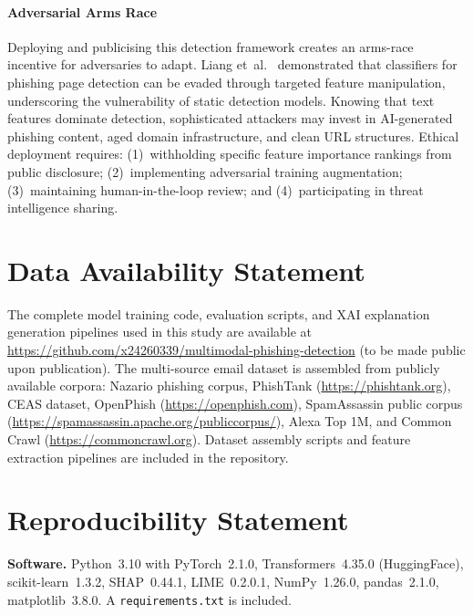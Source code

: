 \documentclass[conference]{IEEEtran}
\begin{document}
\paragraph{Adversarial Arms Race}
Deploying and publicising this detection framework creates an arms-race
incentive for adversaries to adapt. Liang et~al.~\cite{liang2016} demonstrated that classifiers for phishing page detection can be evaded through targeted feature manipulation, underscoring the vulnerability of static detection models. Knowing that text features dominate
detection, sophisticated attackers may invest in AI-generated phishing
content, aged domain infrastructure, and clean URL structures. Ethical
deployment requires: (1)~withholding specific feature importance rankings
from public disclosure; (2)~implementing adversarial training augmentation;
(3)~maintaining human-in-the-loop review; and (4)~participating in threat
intelligence sharing.

\section{Data Availability Statement}
\label{sec:data_availability}

The complete model training code, evaluation scripts, and XAI
explanation generation pipelines used in this study are available at
\url{https://github.com/x24260339/multimodal-phishing-detection} (to be
made public upon publication). The multi-source email dataset is assembled
from publicly available corpora: Nazario phishing corpus, PhishTank
(\url{https://phishtank.org}), CEAS dataset, OpenPhish
(\url{https://openphish.com}), SpamAssassin public corpus
(\url{https://spamassassin.apache.org/publiccorpus/}), Alexa Top 1M, and
Common Crawl (\url{https://commoncrawl.org}). Dataset assembly scripts
and feature extraction pipelines are included in the repository.

\section{Reproducibility Statement}
\label{sec:reproducibility}

\textbf{Software.} Python~3.10 with PyTorch~2.1.0,
Transformers~4.35.0 (HuggingFace), scikit-learn~1.3.2,
SHAP~0.44.1, LIME~0.2.0.1, NumPy~1.26.0, pandas~2.1.0,
matplotlib~3.8.0. A \texttt{requirements.txt} is included.
\end{document}

